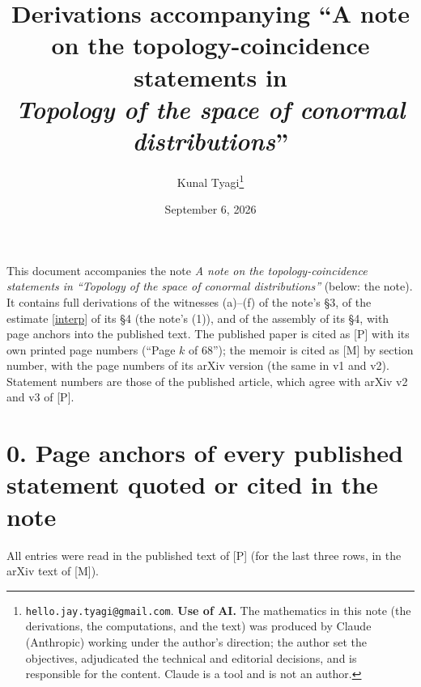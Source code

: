 \documentclass[11pt]{article}
\title{\large Derivations accompanying ``A note on the topology-coincidence statements in\\ \emph{Topology of the space of conormal distributions}''}
\author{\normalsize Kunal Tyagi\thanks{\texttt{hello.jay.tyagi@gmail.com}. \textbf{Use of AI.} The mathematics in this note (the derivations, the computations, and the text) was produced by Claude (Anthropic) working under the author's direction; the author set the objectives, adjudicated the technical and editorial decisions, and is responsible for the content. Claude is a tool and is not an author.}}
\date{\vspace{-1ex}\normalsize September 6, 2026}
\begin{document}
\maketitle
\vspace{-2em}

\noindent This document accompanies the note \emph{A note on the topology-coincidence statements in ``Topology of the space of conormal distributions''} (below: the note). It contains full derivations of the witnesses (a)--(f) of the note's \S3, of the estimate \eqref{interp} of its \S4 (the note's (1)), and of the assembly of its \S4, with page anchors into the published text. The published paper \cite{ALKL24} is cited as [P] with its own printed page numbers (``Page $k$ of 68''); the memoir \cite{ALKL24m} is cited as [M] by section number, with the page numbers of its arXiv version (the same in v1 and v2). Statement numbers are those of the published article, which agree with arXiv v2 and v3 of [P].

\section*{0. Page anchors of every published statement quoted or cited in the note}
\noindent All entries were read in the published text of [P] (for the last three rows, in the arXiv text of [M]).
\end{document}
